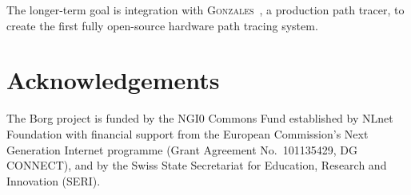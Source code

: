 \documentclass[sigconf,review,natbib=false]{acmart}
\begin{document}
The longer-term goal is integration with \textsc{Gonzales}~\cite{Wendleder2024Gonzales},
a production path tracer, to create the first fully open-source hardware
path tracing system.

\section{Acknowledgements}

The Borg project is funded by the NGI0 Commons Fund established by
NLnet Foundation with financial support from the European Commission's
Next Generation Internet programme
(Grant Agreement No.~101135429, DG CONNECT),
and by the Swiss State Secretariat for Education, Research and
Innovation (SERI).

\printbibliography
\end{document}
